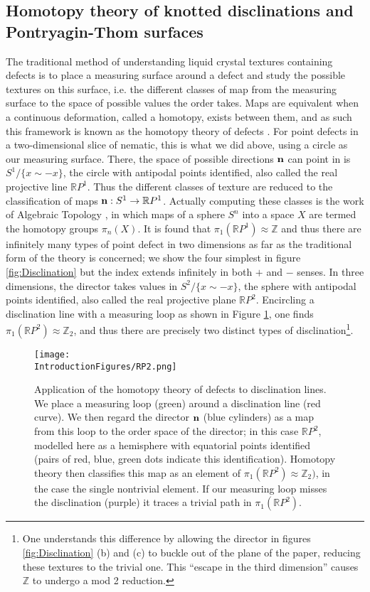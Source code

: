 \subsection{Homotopy theory of knotted disclinations and Pontryagin-Thom surfaces}
The traditional method of understanding liquid crystal textures containing defects is to place a measuring surface around a defect and study the possible textures on this surface, i.e. the different classes of map from the measuring surface to the space of possible values the order takes. Maps are equivalent when a continuous deformation, called a homotopy, exists between them, and as such this framework is known as the homotopy theory of defects \citep{Mermin1979,Alexander2012}. For point defects in a two-dimensional slice of nematic, this is what we did above, using a circle as our measuring surface. There, the space of possible directions $\bf n$ can point in is $S^1/\{x\sim-x\}$, the circle with antipodal points identified, also called the real projective line $\mathbb{R}P^1$. Thus the different classes of texture are reduced to the classification of maps ${\bf n}:S^1 \rightarrow \mathbb{R}P^1$. Actually computing these classes is the work of Algebraic Topology \citep{Hatcher2012}, in which maps of a sphere $S^n$ into a space $X$ are termed the homotopy groups $\pi_n(X)$. It is found that $\pi_1(\mathbb{R}P^1) \approx \mathbb{Z}$ and thus there are infinitely many types of point defect in two dimensions as far as the traditional form of the theory is concerned; we show the four simplest in figure \ref{fig:Disclination} but the index extends infinitely in both $+$ and $-$ senses. In three dimensions, the director takes values in $S^2/\{x\sim-x\}$, the sphere with antipodal points identified, also called the real projective plane $\mathbb{R}P^2$. Encircling a disclination line with a measuring loop as shown in Figure \ref{fig:RP2}, one finds $\pi_1(\mathbb{R}P^2) \approx \mathbb{Z}_2$, and thus there are precisely two distinct types of disclination\footnote{ One understands this difference by allowing the director in figures \ref{fig:Disclination} (b) and (c) to buckle out of the plane of the paper, reducing these textures to the trivial one. This ``escape in the third dimension'' causes $\mathbb{Z}$ to undergo a mod 2 reduction.}.
\begin{figure}[htbp]
\centering
\texttt{[image: \\IntroductionFigures/RP2.png]}
\caption{Application of the homotopy theory of defects to disclination lines. We place a measuring loop (green) around a disclination line (red curve). We then regard the director $\bf n$ (blue cylinders) as a map from this loop to the order space of the director; in this case $\mathbb{R}P^2$, modelled here as a hemisphere with equatorial points identified (pairs of red, blue, green dots indicate this identification). Homotopy theory then classifies this map as an element of $\pi_1(\mathbb{R}P^2) \approx \mathbb{Z}_2)$, in the case the single nontrivial element. If our measuring loop misses the disclination (purple) it traces a trivial path in $\pi_1(\mathbb{R}P^2)$.}
\label{fig:RP2}
\end{figure}

